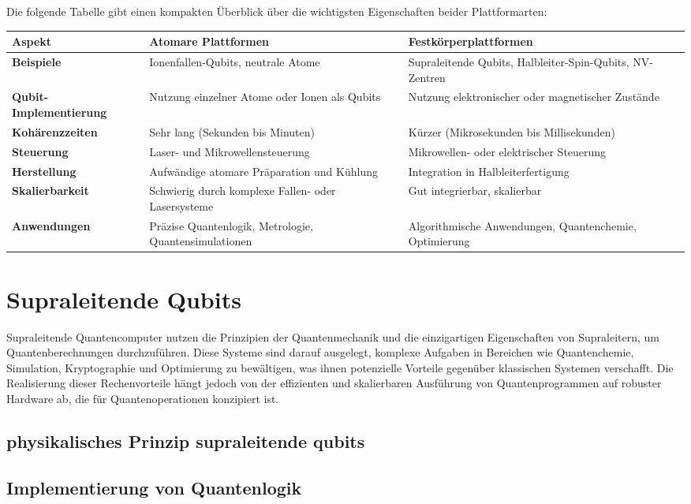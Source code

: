 Die folgende Tabelle gibt einen kompakten Überblick über die wichtigsten Eigenschaften beider Plattformarten:

\begin{tabular}{ |p{4cm}|p{5cm}|p{5cm}|  }
 \hline
 \textbf{Aspekt}& \textbf{Atomare Plattformen} & \textbf{Festkörperplattformen}\\
 \hline
 \textbf{Beispiele}   & Ionenfallen-Qubits, neutrale Atome    &Supraleitende Qubits, Halbleiter-Spin-Qubits, NV-Zentren\\
 \textbf{Qubit-Implementierung}&   Nutzung einzelner Atome oder Ionen als Qubits	  & Nutzung elektronischer oder magnetischer Zustände
\\
 \textbf{Kohärenzzeiten} &Sehr lang (Sekunden bis Minuten)	 & Kürzer (Mikrosekunden bis Millisekunden)
\\
 \textbf{Steuerung}    &Laser- und Mikrowellensteuerung	 & Mikrowellen- oder elektrischer Steuerung
\\
 \textbf{Herstellung}&   Aufwändige atomare Präparation und Kühlung	  & Integration in Halbleiterfertigung
\\
 \textbf{Skalierbarkeit}& Schwierig durch komplexe Fallen- oder Lasersysteme	  & Gut integrierbar, skalierbar
   \\
 \textbf{Anwendungen}& Präzise Quantenlogik, Metrologie, Quantensimulationen	  & Algorithmische Anwendungen, Quantenchemie, Optimierung
\\
 \hline
\end{tabular}

\section{Supraleitende Qubits}
Supraleitende Quantencomputer nutzen die Prinzipien der Quantenmechanik und die einzigartigen Eigenschaften von Supraleitern, um Quantenberechnungen durchzuführen. Diese Systeme sind darauf ausgelegt, komplexe Aufgaben in Bereichen wie Quantenchemie, Simulation, Kryptographie und Optimierung zu bewältigen, was ihnen potenzielle Vorteile gegenüber klassischen Systemen verschafft. Die Realisierung dieser Rechenvorteile hängt jedoch von der effizienten und skalierbaren Ausführung von Quantenprogrammen auf robuster Hardware ab, die für Quantenoperationen konzipiert ist.
\subsection{physikalisches Prinzip supraleitende qubits}
\subsection{Implementierung von Quantenlogik}

